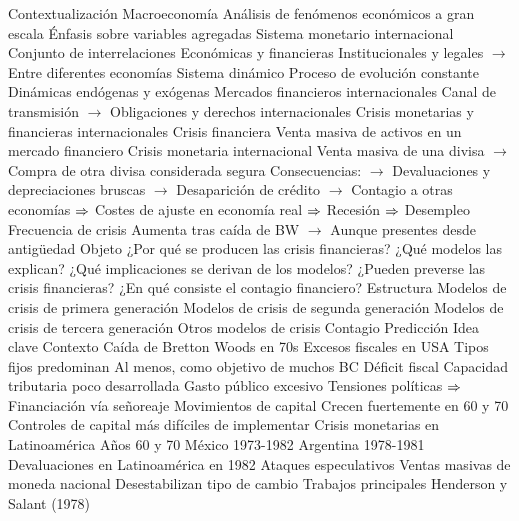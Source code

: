 \documentclass{nuevotema}
\begin{document}
\begin{esquemal}
	\1[] 
		\2 Contextualización
			\3 Macroeconomía
				\4 Análisis de fenómenos económicos a gran escala
				\4 Énfasis sobre variables agregadas
			\3 Sistema monetario internacional
				\4 Conjunto de interrelaciones
				\4[] Económicas y financieras
				\4[] Institucionales y legales
				\4[] $\to$ Entre diferentes economías
				\4 Sistema dinámico
				\4[] Proceso de evolución constante
				\4[] Dinámicas endógenas y exógenas
				\4 Mercados financieros internacionales
				\4[] Canal de transmisión
				\4[] $\to$ Obligaciones y derechos internacionales
			\3 Crisis monetarias y financieras internacionales
				\4 Crisis financiera
				\4[] Venta masiva de activos en un mercado financiero
				\4 Crisis monetaria internacional
				\4[] Venta masiva de una divisa
				\4[] $\to$ Compra de otra divisa considerada segura
				\4 Consecuencias:
				\4[] $\to$ Devaluaciones y depreciaciones bruscas
				\4[] $\to$ Desaparición de crédito
				\4[] $\to$ Contagio a otras economías
				\4[] $\Rightarrow$ Costes de ajuste en economía real
				\4[] $\Rightarrow$ Recesión
				\4[] $\Rightarrow$ Desempleo
				\4 Frecuencia de crisis
				\4[] Aumenta tras caída de BW
				\4[] $\to$ Aunque presentes desde antigüedad
		\2 Objeto
			\3 ¿Por qué se producen las crisis financieras?
			\3 ¿Qué modelos las explican?
			\3 ¿Qué implicaciones se derivan de los modelos?
			\3 ¿Pueden preverse las crisis financieras?
			\3 ¿En qué consiste el contagio financiero?
		\2 Estructura
			\3 Modelos de crisis de primera generación
			\3 Modelos de crisis de segunda generación
			\3 Modelos de crisis de tercera generación
			\3 Otros modelos de crisis
			\3 Contagio
			\3 Predicción
	\1 
		\2 Idea clave
			\3 Contexto
				\4 Caída de Bretton Woods en 70s
				\4[] Excesos fiscales en USA
				\4 Tipos fijos predominan
				\4[] Al menos, como objetivo de muchos BC
				\4 Déficit fiscal
				\4[] Capacidad tributaria poco desarrollada
				\4[] Gasto público excesivo
				\4[] Tensiones políticas
				\4[] $\Rightarrow$ Financiación vía señoreaje
				\4 Movimientos de capital
				\4[] Crecen fuertemente en 60 y 70
				\4[] Controles de capital más difíciles de implementar
				\4 Crisis monetarias en Latinoamérica
				\4[] Años 60 y 70
				\4[] México 1973-1982
				\4[] Argentina 1978-1981
				\4[] Devaluaciones en Latinoamérica en 1982
				\4 Ataques especulativos
				\4[] Ventas masivas de moneda nacional
				\4[] Desestabilizan tipo de cambio
				\4 Trabajos principales
				\4[] Henderson y Salant (1978)

\end{esquemal}
\end{document}
